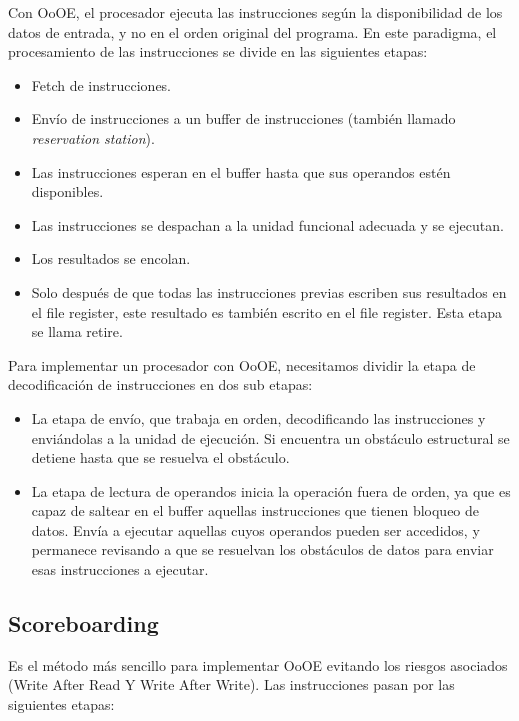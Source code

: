 Con OoOE, el procesador ejecuta las instrucciones seg\'un la disponibilidad de los datos de entrada, y no en el orden original del programa.
En este paradigma, el procesamiento de las instrucciones se divide en las siguientes etapas:

\begin{itemize}
 \item Fetch de instrucciones.
 \item Env\'io de instrucciones a un buffer de instrucciones (tambi\'en llamado \textit{reservation station}).
 \item Las instrucciones esperan en el buffer hasta que sus operandos est\'en disponibles.
 \item Las instrucciones se despachan a la unidad funcional adecuada y se ejecutan.
 \item Los resultados se encolan.
 \item Solo despu\'es de que todas las instrucciones previas escriben sus resultados en el file register, este resultado es tambi\'en
 escrito en el file register. Esta etapa se llama retire.
\end{itemize}

Para implementar un procesador con OoOE, necesitamos dividir la etapa de decodificaci\'on de instrucciones en dos sub etapas:

\begin{itemize}
 \item La etapa de env\'io, que trabaja en orden, decodificando las instrucciones y envi\'andolas a la unidad de ejecuci\'on. Si encuentra
 un obst\'aculo estructural se detiene hasta que se resuelva el obst\'aculo.
 \item La etapa de lectura de operandos inicia la operaci\'on fuera de orden, ya que es capaz de saltear en el buffer aquellas instrucciones que
 tienen bloqueo de datos. Env\'ia a ejecutar aquellas cuyos operandos pueden ser accedidos, y permanece revisando a que se resuelvan los obst\'aculos
 de datos para enviar esas instrucciones a ejecutar.
\end{itemize}

\subsection{Scoreboarding}

Es el m\'etodo m\'as sencillo para implementar OoOE evitando los riesgos asociados (Write After Read Y Write After Write). Las instrucciones pasan
por las siguientes etapas:

